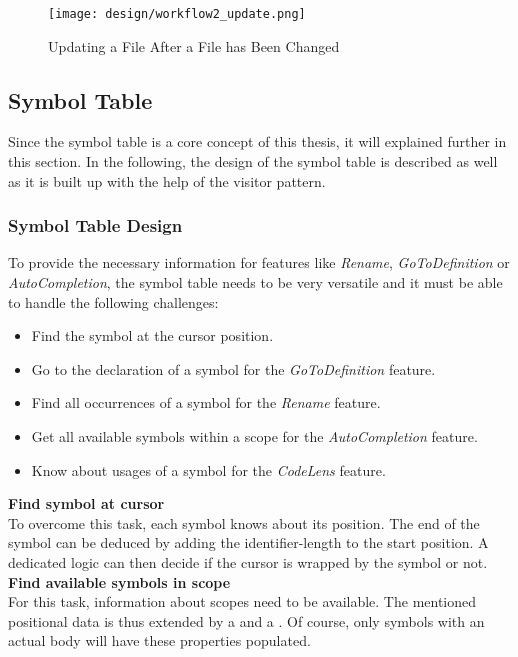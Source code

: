 \begin{figure}[H]
    \centering
    \texttt{[image: design/workflow2\_update.png]}
    \caption{Updating a File After a File has Been Changed}
    \label{fig:workflow2}
\end{figure}

\pagebreak
\subsection{Symbol Table}
Since the symbol table is a core concept of this thesis, it will explained further in this section.
In the following, the design of the symbol table is described as well as it is built up with the help of the visitor pattern.

\subsubsection{Symbol Table Design}
To provide the necessary information for features like \textit{Rename}, \textit{GoToDefinition} or \textit{AutoCompletion},
the symbol table needs to be very versatile and it must be able to handle the following challenges:
\begin{itemize}
    \item Find the symbol at the cursor position.
    \item Go to the declaration of a symbol for the \textit{GoToDefinition} feature.
    \item Find all occurrences of a symbol for the \textit{Rename} feature.
    \item Get all available symbols within a scope for the \textit{AutoCompletion} feature.
    \item Know about usages of a symbol for the \textit{CodeLens} feature.
\end{itemize}

\textbf{Find symbol at cursor}\\
To overcome this task, each symbol knows about its position.
The end of the symbol can be deduced by adding the identifier-length to the start position.
A dedicated logic can then decide if the cursor is wrapped by the symbol or not.\\

\textbf{Find available symbols in scope}\\
For this task, information about scopes need to be available.
The mentioned positional data is thus extended by a  and a .
Of course, only symbols with an actual body will have these properties populated.\\

